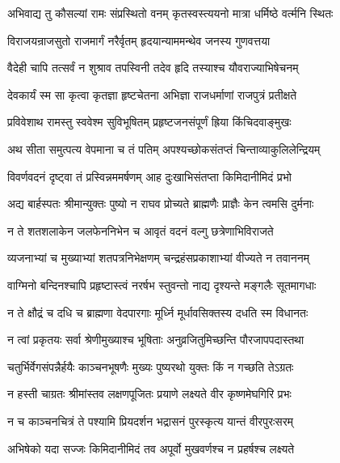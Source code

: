 \twolineshloka
{अभिवाद्य तु कौसल्यां रामः संप्रस्थितो वनम्}
{कृतस्वस्त्ययनो मात्रा धर्मिष्ठे वर्त्मनि स्थितः} %

\twolineshloka
{विराजयन्राजसुतो राजमार्गं नरैर्वृतम्}
{हृदयान्याममन्थेव जनस्य गुणवत्तया} %

\twolineshloka
{वैदेही चापि तत्सर्वं न शुश्राव तपस्विनी}
{तदेव हृदि तस्याश्च यौवराज्याभिषेचनम्} %

\twolineshloka
{देवकार्यं स्म सा कृत्वा कृतज्ञा हृष्टचेतना}
{अभिज्ञा राजधर्माणां राजपुत्रं प्रतीक्षते} %

\twolineshloka
{प्रविवेशाथ रामस्तु स्ववेश्म सुविभूषितम्}
{प्रहृष्टजनसंपूर्णं ह्रिया किंचिदवाङ्मुखः} %

\twolineshloka
{अथ सीता समुत्पत्य वेपमाना च तं पतिम्}
{अपश्यच्छोकसंतप्तं चिन्ताव्याकुलिलेन्द्रियम्} %

\twolineshloka
{विवर्णवदनं दृष्ट्वा तं प्रस्विन्नममर्षणम्}
{आह दुःखाभिसंतप्ता किमिदानीमिदं प्रभो} %

\twolineshloka
{अद्य बार्हस्पतः श्रीमान्युक्तः पुष्यो न राघव}
{प्रोच्यते ब्राह्मणैः प्राज्ञैः केन त्वमसि दुर्मनाः} %

\twolineshloka
{न ते शतशलाकेन जलफेननिभेन च}
{आवृतं वदनं वल्गु छत्रेणाभिविराजते} %

\twolineshloka
{व्यजनाभ्यां च मुख्याभ्यां शतपत्रनिभेक्षणम्}
{चन्द्रहंसप्रकाशाभ्यां वीज्यते न तवाननम्} %

\twolineshloka
{वाग्मिनो बन्दिनश्चापि प्रहृष्टास्त्वं नरर्षभ}
{स्तुवन्तो नाद्य दृश्यन्ते मङ्गलैः सूतमागधाः} %

\twolineshloka
{न ते क्षौद्रं च दधि च ब्राह्मणा वेदपारगाः}
{मूर्ध्नि मूर्धावसिक्तस्य दधति स्म विधानतः} %

\twolineshloka
{न त्वां प्रकृतयः सर्वा श्रेणीमुख्याश्च भूषिताः}
{अनुव्रजितुमिच्छन्ति पौरजापपदास्तथा} %

\twolineshloka
{चतुर्भिर्वेगसंपन्नैर्हयैः काञ्चनभूषणैः}
{मुख्यः पुष्यरथो युक्तः किं न गच्छति तेऽग्रतः} %

\twolineshloka
{न हस्ती चाग्रतः श्रीमांस्तव लक्षणपूजितः}
{प्रयाणे लक्ष्यते वीर कृष्णमेघगिरि प्रभः} %

\twolineshloka
{न च काञ्चनचित्रं ते पश्यामि प्रियदर्शन}
{भद्रासनं पुरस्कृत्य यान्तं वीरपुरःसरम्} %

\twolineshloka
{अभिषेको यदा सज्जः किमिदानीमिदं तव}
{अपूर्वो मुखवर्णश्च न प्रहर्षश्च लक्ष्यते} %

